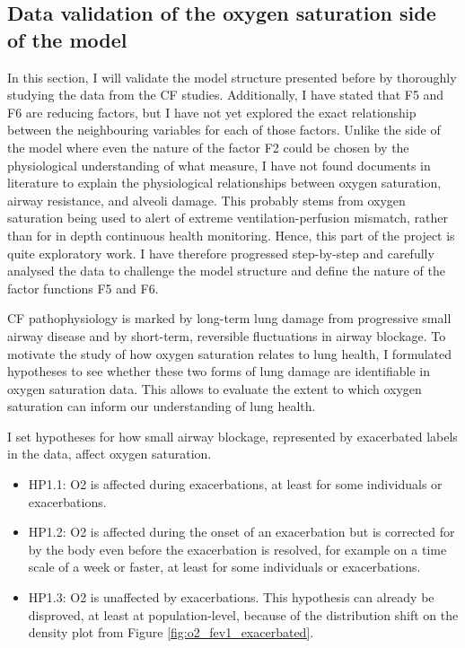 
\subsection{Data validation of the oxygen saturation side of the model}

In this section, I will validate the model structure presented before by thoroughly studying the data from the CF studies. Additionally, I have stated that F5 and F6 are reducing factors, but I have not yet explored the exact relationship between the neighbouring variables for each of those factors. Unlike the \F side of the model where even the nature of the factor F2 could be chosen by the physiological understanding of what \F measure, I have not found documents in literature to explain the physiological relationships between oxygen saturation, airway resistance, and alveoli damage. This probably stems from oxygen saturation being used to alert of extreme ventilation-perfusion mismatch, rather than for in depth continuous health monitoring. Hence, this part of the project is quite exploratory work. I have therefore progressed step-by-step and carefully analysed the data to challenge the model structure and define the nature of the factor functions F5 and F6.

CF pathophysiology is marked by long-term lung damage from progressive small airway disease and by short-term, reversible fluctuations in airway blockage. To motivate the study of how oxygen saturation relates to lung health, I formulated hypotheses to see whether these two forms of lung damage are identifiable in oxygen saturation data. This allows to evaluate the extent to which oxygen saturation can inform our understanding of lung health.

I set hypotheses for how small airway blockage, represented by exacerbated labels in the data, affect oxygen saturation.
\begin{itemize}
    \item HP1.1: O2 is affected during exacerbations, at least for some individuals or exacerbations.
\item HP1.2: O2 is affected during the onset of an exacerbation but is corrected for by the body even before the exacerbation is resolved, for example on a time scale of a week or faster, at least for some individuals or exacerbations.
\item HP1.3: O2 is unaffected by exacerbations. This hypothesis can already be disproved, at least at population-level, because of the distribution shift on the \SP density plot from Figure \ref{fig:o2_fev1_exacerbated}.
\end{itemize}

